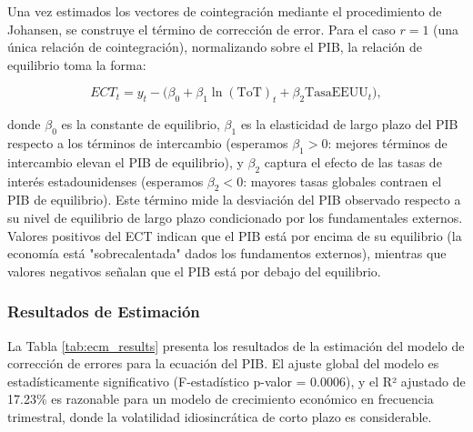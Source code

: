 \documentclass[3p,11pt,draft,natbib=false]{elsarticle}
\begin{document}
Una vez estimados los vectores de cointegración mediante el procedimiento de Johansen, se construye el término de corrección de error. Para el caso $r=1$ (una única relación de cointegración), normalizando sobre el PIB, la relación de equilibrio toma la forma:

\begin{equation}
ECT_{t} = y_t - \Big( \beta_0 + \beta_1 \ln(\text{ToT})_t + \beta_2 \text{TasaEEUU}_t \Big),
\label{eq:ect_definition}
\end{equation}

donde $\beta_0$ es la constante de equilibrio, $\beta_1$ es la elasticidad de largo plazo del PIB respecto a los términos de intercambio (esperamos $\beta_1>0$: mejores términos de intercambio elevan el PIB de equilibrio), y $\beta_2$ captura el efecto de las tasas de interés estadounidenses (esperamos $\beta_2<0$: mayores tasas globales contraen el PIB de equilibrio). Este término mide la desviación del PIB observado respecto a su nivel de equilibrio de largo plazo condicionado por los fundamentales externos. Valores positivos del ECT indican que el PIB está por encima de su equilibrio (la economía está "sobrecalentada" dados los fundamentos externos), mientras que valores negativos señalan que el PIB está por debajo del equilibrio.

\subsubsection{Resultados de Estimación}

La Tabla \ref{tab:ecm_results} presenta los resultados de la estimación del modelo de corrección de errores para la ecuación del PIB. El ajuste global del modelo es estadísticamente significativo (F-estadístico p-valor = 0.0006), y el R² ajustado de 17.23\% es razonable para un modelo de crecimiento económico en frecuencia trimestral, donde la volatilidad idiosincrática de corto plazo es considerable.
\end{document}
